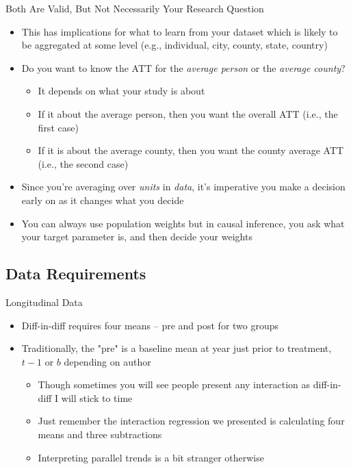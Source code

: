 \documentclass{beamer}
\begin{document}
\begin{frame}{Both Are Valid, But Not Necessarily Your Research Question}

\begin{itemize}
\item This has implications for what to learn from your dataset which is likely to be aggregated at some level (e.g., individual, city, county, state, country)
\item Do you want to know the ATT for the \emph{average person} or the \emph{average county}?
	\begin{itemize}
	\item It depends on what your study is about
	\item If it about the average person, then you want the overall ATT (i.e., the first case)
	\item If it is about the average county, then you want the county average ATT (i.e., the second case)
	\end{itemize}
\item Since you're averaging over \emph{units} in \emph{data}, it's imperative you make a decision early on as it changes what you decide
\item You can always use population weights but in causal inference, you ask what your target parameter is, and then decide your weights
\end{itemize}

\end{frame}

\subsection{Data Requirements}

\begin{frame}{Longitudinal Data}

\begin{itemize}

\item Diff-in-diff requires four means -- pre and post for two groups
\item Traditionally, the "pre" is a baseline mean at year just prior to treatment, $t-1$ or $b$ depending on author
	\begin{itemize}
	\item Though sometimes you will see people present any interaction as diff-in-diff I will stick to time
	\item Just remember the interaction regression we presented is calculating four means and three subtractions
	\item Interpreting parallel trends is a bit stranger otherwise
	\end{itemize}
\end{itemize}

\end{frame}
\end{document}
